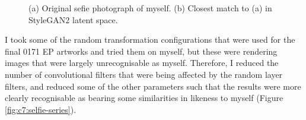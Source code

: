 \begin{figure}[!htbp]
    \hfill
    \hfill
    \caption[Selfie and latent projected into StyleGAN2 latent space comparison]{(a) Original sefie photograph of myself. (b) Closest match to (a) in StyleGAN2 latent space.}
    \label{fig:c7:selfie}
 \end{figure}

I took some of the random transformation configurations that were used for the final 0171 EP artworks and tried them on myself, but these were rendering images that were largely unrecognisable as myself. 
Therefore, I reduced the number of convolutional filters that were being affected by the random layer filters, and reduced some of the other parameters such that the results were more clearly recognisable as bearing some similarities in likeness to myself (Figure \ref{fig:c7:selfie-series}).


